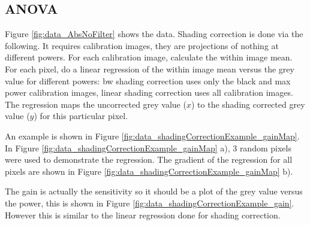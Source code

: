 
\subsection{ANOVA}

Figure \ref{fig:data_AbsNoFilter} shows the data. Shading correction is done via the following. It requires calibration images, they are projections of nothing at different powers. For each calibration image, calculate the within image mean. For each pixel, do a linear regression of the within image mean versus the grey value for different powers: bw shading correction uses only the black and max power calibration images, linear shading correction uses all calibration images. The regression maps the uncorrected grey value ($x$) to the shading corrected grey value ($y$) for this particular pixel.

An example is shown in Figure \ref{fig:data_shadingCorrectionExample_gainMap}. In Figure \ref{fig:data_shadingCorrectionExample_gainMap} a), 3 random pixels were used to demonstrate the regression. The gradient of the regression for all pixels are shown in Figure \ref{fig:data_shadingCorrectionExample_gainMap} b).



The gain is actually the sensitivity so it should be a plot of the grey value versus the power, this is shown in Figure \ref{fig:data_shadingCorrectionExample_gain}. However this is similar to the linear regression done for shading correction.




